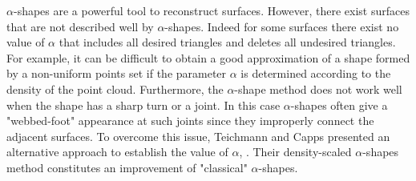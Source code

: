 \indent $\alpha$-shapes are a powerful tool to reconstruct surfaces. However, there exist surfaces that are not described well by $ \alpha $-shapes. Indeed for some surfaces there exist no value of $\alpha$ that includes all desired triangles and deletes all undesired triangles. For example, it can be difficult to obtain a good approximation of a shape formed by a non-uniform points set if the parameter $\alpha$ is determined according to the density of the point cloud. Furthermore, the $\alpha$-shape method does not work well when the shape has a sharp turn or a joint. In this case $\alpha$-shapes often give a "webbed-foot" appearance at such joints since they improperly connect the adjacent surfaces. To overcome this issue, Teichmann and Capps presented an alternative approach to establish the value of $\alpha$, \cite{teichmann1998surface}. Their density-scaled $\alpha$-shapes method constitutes an improvement of "classical" $\alpha$-shapes.

